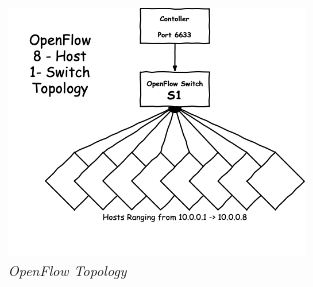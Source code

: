 \begin{figure}[!ht]
\centering
\includegraphics*[width=0.7\textwidth]{images/openflow.png}
\caption{\em OpenFlow Topology}
\label{img:opentop}
\end{figure}

